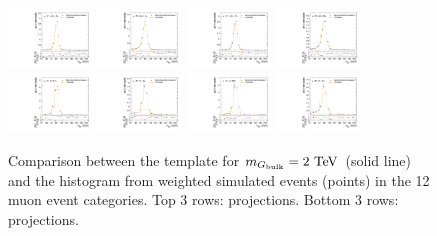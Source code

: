 \begin{figure}[htpb]
  \includegraphics[width=0.2\textwidth]{fig/2Dfit/templateVsReco_GbuToWW2000_r0_MJ_mu_HP_nobb_LDy.pdf}
  \includegraphics[width=0.2\textwidth]{fig/2Dfit/templateVsReco_GbuToWW2000_r0_MJ_mu_LP_nobb_LDy.pdf}
  \includegraphics[width=0.2\textwidth]{fig/2Dfit/templateVsReco_GbuToWW2000_r0_MJ_mu_HP_nobb_HDy.pdf}
  \includegraphics[width=0.2\textwidth]{fig/2Dfit/templateVsReco_GbuToWW2000_r0_MJ_mu_LP_nobb_HDy.pdf}\\
  \includegraphics[width=0.2\textwidth]{fig/2Dfit/templateVsReco_GbuToWW2000_r0_MJ_mu_HP_vbf_LDy.pdf}
  \includegraphics[width=0.2\textwidth]{fig/2Dfit/templateVsReco_GbuToWW2000_r0_MJ_mu_LP_vbf_LDy.pdf}
  \includegraphics[width=0.2\textwidth]{fig/2Dfit/templateVsReco_GbuToWW2000_r0_MJ_mu_HP_vbf_HDy.pdf}
  \includegraphics[width=0.2\textwidth]{fig/2Dfit/templateVsReco_GbuToWW2000_r0_MJ_mu_LP_vbf_HDy.pdf}\\
  \caption{
    Comparison between the \ggF\GBulktoWW template for $m_{\GBulk}=2\unit{TeV}$ (solid line) and the histogram from weighted simulated events (points) in the 12 muon event categories.
    Top 3 rows: \MVV projections.
    Bottom 3 rows: \MJ projections.
  }
  \label{fig:1dtemplateVsReco_GbuToWW2000_Run2}
\end{figure}

